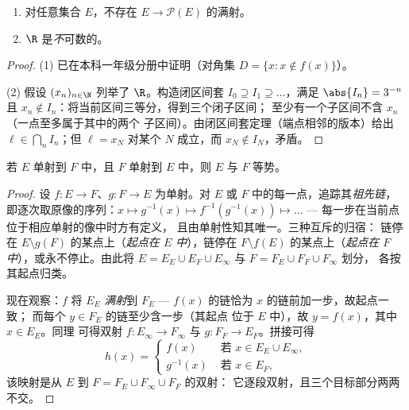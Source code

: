 \begin{theorem}[康托；$\R$ 的不可数性]\label{thm:b2:structures:cantor}
\begin{enumerate}
  \item 对任意集合 $E$，不存在 $E \to
        \mathcal{P}(E)$ 的满射。
  \item $\R$ 是\emph{不}可数的。
\end{enumerate}
\end{theorem}

\begin{proof}
(1) 已在本科一年级分册中证明（对角集 $D = \{x : x
\notin f(x)\}$）。

(2) 假设 $(x_n)_{n \in \N}$ 列举了 $\R$。构造闭区间套
$I_0 \supseteq I_1 \supseteq \dots$，满足 $\abs{I_n} = 3^{-n}$ 且
$x_n \notin I_n$：将当前区间三等分，得到三个闭子区间；
至少有一个子区间不含 $x_n$（一点至多属于其中的两个
子区间）。由闭区间套定理（端点相邻的版本）给出
$\ell \in \bigcap_n I_n$；但 $\ell = x_N$ 对某个 $N$ 成立，而 $x_N
\notin I_N$，矛盾。
\end{proof}

\begin{theorem}[康托--伯恩斯坦]\label{thm:b2:structures:cantorbernstein}
若 $E$ 单射到 $F$ 中，且 $F$ 单射到 $E$ 中，则 $E$ 与 $F$
等势。
\end{theorem}

\begin{proof}
设 $f \colon E \to F$、$g \colon F \to E$ 为单射。对
$E$ 或 $F$ 中的每一点，追踪其\emph{祖先链}，
即逐次取原像的序列：$x \mapsto g^{-1}(x) \mapsto
f^{-1}(g^{-1}(x)) \mapsto \dots$ --- 每一步在当前点
位于相应单射的像中时方有定义，
且由单射性知其唯一。三种互斥的归宿：
链停在 $E \setminus g(F)$ 的某点上（\emph{起点在
$E$ 中}），链停在 $F \setminus f(E)$ 的某点上（\emph{起点在
$F$ 中}），或永不停止。由此将 $E = E_E \cup E_F \cup
E_\infty$ 与 $F = F_E \cup F_F \cup F_\infty$ 划分，
各按其起点归类。

现在观察：$f$ 将 $E_E$ \emph{满射}到 $F_E$ ---
$f(x)$ 的链恰为 $x$ 的链前加一步，故起点一致；
而每个 $y \in F_E$ 的链至少含一步（其起点
位于 $E$ 中），故 $y = f(x)$，其中 $x \in E_E$。同理
可得双射 $f \colon E_\infty \to F_\infty$ 与 $g \colon F_F
\to E_F$。拼接可得
\[
h(x) =
\begin{cases}
f(x) & \text{ 若 } x \in E_E \cup E_\infty,\\
g^{-1}(x) & \text{ 若 } x \in E_F,
\end{cases}
\]
该映射是从 $E$ 到 $F = F_E \cup F_\infty \cup F_F$ 的双射：
它逐段双射，且三个目标部分两两不交。
\end{proof}

